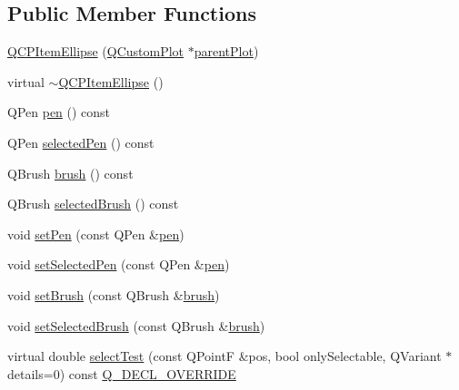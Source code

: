 \subsection*{Public Member Functions}
\begin{DoxyCompactItemize}
\item 
\mbox{\hyperlink{class_q_c_p_item_ellipse_a759b77ef002515eba0263b5447ecb3fb}{Q\+C\+P\+Item\+Ellipse}} (\mbox{\hyperlink{class_q_custom_plot}{Q\+Custom\+Plot}} $\ast$\mbox{\hyperlink{class_q_c_p_layerable_a473edb813a4c1929d6b6a8fe3ff3faf7}{parent\+Plot}})
\item 
virtual \mbox{\hyperlink{class_q_c_p_item_ellipse_a3c17073a1805d32b4e09b6ccde0bef76}{$\sim$\+Q\+C\+P\+Item\+Ellipse}} ()
\item 
Q\+Pen \mbox{\hyperlink{class_q_c_p_item_ellipse_a8288f7ce760fc795f5ce4e61136bda19}{pen}} () const
\item 
Q\+Pen \mbox{\hyperlink{class_q_c_p_item_ellipse_a9a200af2797356b45479b601d75437ee}{selected\+Pen}} () const
\item 
Q\+Brush \mbox{\hyperlink{class_q_c_p_item_ellipse_aacf45d032f204d0df3dd0bfdf1172cd3}{brush}} () const
\item 
Q\+Brush \mbox{\hyperlink{class_q_c_p_item_ellipse_afeda9d8e2e6da216a3c3366d87e80feb}{selected\+Brush}} () const
\item 
void \mbox{\hyperlink{class_q_c_p_item_ellipse_adb81a663ed2420fcfa011e49f678d1a6}{set\+Pen}} (const Q\+Pen \&\mbox{\hyperlink{class_q_c_p_item_ellipse_a8288f7ce760fc795f5ce4e61136bda19}{pen}})
\item 
void \mbox{\hyperlink{class_q_c_p_item_ellipse_a6c542fba1dc918041c583f58a50dde99}{set\+Selected\+Pen}} (const Q\+Pen \&\mbox{\hyperlink{class_q_c_p_item_ellipse_a8288f7ce760fc795f5ce4e61136bda19}{pen}})
\item 
void \mbox{\hyperlink{class_q_c_p_item_ellipse_a49fc74e6965834e873d027d026def798}{set\+Brush}} (const Q\+Brush \&\mbox{\hyperlink{class_q_c_p_item_ellipse_aacf45d032f204d0df3dd0bfdf1172cd3}{brush}})
\item 
void \mbox{\hyperlink{class_q_c_p_item_ellipse_a9693501cfaa43a099655c75bed0dab3f}{set\+Selected\+Brush}} (const Q\+Brush \&\mbox{\hyperlink{class_q_c_p_item_ellipse_aacf45d032f204d0df3dd0bfdf1172cd3}{brush}})
\item 
virtual double \mbox{\hyperlink{class_q_c_p_item_ellipse_ab6e2b8a29695c606c7731e498297ca29}{select\+Test}} (const Q\+PointF \&pos, bool only\+Selectable, Q\+Variant $\ast$details=0) const \mbox{\hyperlink{qcustomplot_8h_a42cc5eaeb25b85f8b52d2a4b94c56f55}{Q\+\_\+\+D\+E\+C\+L\+\_\+\+O\+V\+E\+R\+R\+I\+DE}}
\end{DoxyCompactItemize}
